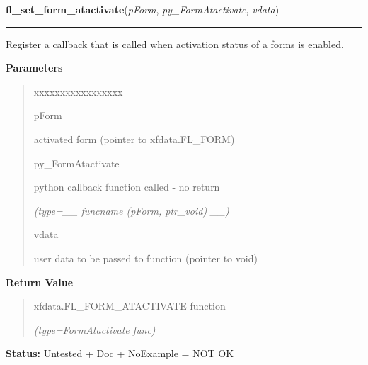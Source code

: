     \vspace{0.5ex}

\hspace{.8\funcindent}\begin{boxedminipage}{\funcwidth}

    \raggedright \textbf{fl\_set\_form\_atactivate}(\textit{pForm}, \textit{py\_FormAtactivate}, \textit{vdata})

    \vspace{-1.5ex}

    \rule{\textwidth}{0.5\fboxrule}
\setlength{\parskip}{2ex}
    Register a callback that is called when activation status of a forms is
    enabled,

\setlength{\parskip}{1ex}
      \textbf{Parameters}
      \vspace{-1ex}

      \begin{quote}
        \begin{Ventry}{xxxxxxxxxxxxxxxxx}

          \item[pForm]

          activated form (pointer to xfdata.FL\_FORM)

          \item[py\_FormAtactivate]

          python callback function called - no return

            {\it (type=\_\_ funcname (pForm, ptr\_void) \_\_)}

          \item[vdata]

          user data to be passed to function (pointer to void)

        \end{Ventry}

      \end{quote}

      \textbf{Return Value}
    \vspace{-1ex}

      \begin{quote}
      xfdata.FL\_FORM\_ATACTIVATE function

      {\it (type=FormAtactivate func)}

      \end{quote}

\textbf{Status:} Untested + Doc + NoExample = NOT OK



    \end{boxedminipage}

